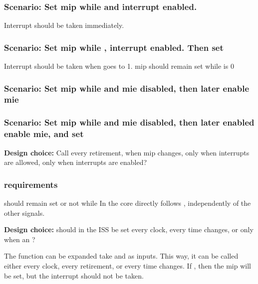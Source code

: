 \subsubsection{Scenario: Set mip while  and interrupt enabled.}

Interrupt should be taken immediately.

\subsubsection{Scenario: Set mip  while , interrupt enabled. Then set }

Interrupt should be taken when  goes to 1. mip should remain set while  is 0

\subsubsection{Scenario: Set mip  while  and mie disabled, then later enable mie }

\subsubsection{Scenario: Set mip  while  and mie disabled, then later enabled enable mie, and set }


\textbf{Design choice:} Call  every retirement, when mip changes, only when interrupts are allowed, only when interrupts are enabled?

\subsubsection{requirements}

 should remain set or not while 
In the core  directly follows , independently of the other signals. 

\textbf{Design choice:} should  in the ISS be set every clock, every time  changes, or only when an ?

The  function can be expanded take  and  as inputs. This way, it can be called either every clock, every retirement, or every time  changes. If , then the mip will be set, but the interrupt should not be taken. 


